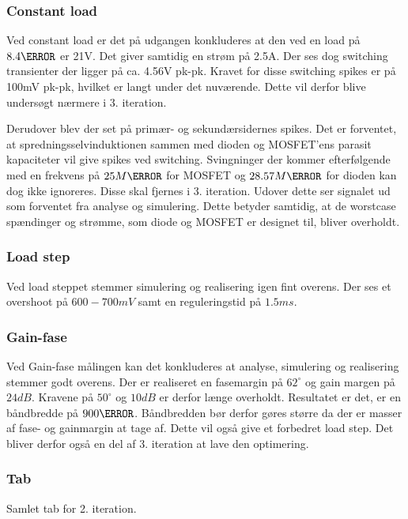 \subsubsection{Constant load}
Ved constant load er det på udgangen konkluderes at den ved en load på $8.4\ohm$ er 21V. Det giver samtidig en strøm på 2.5A. Der ses dog switching transienter der ligger på ca. 4.56V pk-pk. Kravet for disse switching spikes er på 100mV pk-pk, hvilket er langt under det nuværende. Dette vil derfor blive undersøgt nærmere i 3. iteration.


\noindent Derudover blev der set på primær- og sekundærsidernes spikes. Det er forventet, at spredningsselvinduktionen sammen med dioden og MOSFET'ens parasit kapaciteter vil give spikes ved switching. Svingninger der kommer efterfølgende med en frekvens på $25M\hertz$ for MOSFET og $28.57M\hertz$ for dioden kan dog ikke ignoreres. Disse skal fjernes i 3. iteration. Udover dette ser signalet ud som forventet fra analyse og simulering. Dette betyder samtidig, at de worstcase spændinger og strømme, som diode og MOSFET er designet til, bliver overholdt. 
\subsubsection{Load step}
Ved load steppet stemmer simulering og realisering igen fint overens. Der ses et overshoot på $600-700mV$ samt en reguleringstid på $1.5ms$. 
\subsubsection{Gain-fase}
Ved Gain-fase målingen kan det konkluderes at analyse, simulering og realisering stemmer godt overens. Der er realiseret en fasemargin på $62^\circ$ og gain margen på $24dB.$ Kravene på $50^\circ$ og $10dB$ er derfor længe overholdt. Resultatet er det, er en båndbredde på $900\hertz$. Båndbredden bør derfor gøres større da der er masser af fase- og gainmargin at tage af. Dette vil også give et forbedret load step. Det bliver derfor også en del af 3. iteration at lave den optimering.   
\subsubsection{Tab}
Samlet tab for 2. iteration.